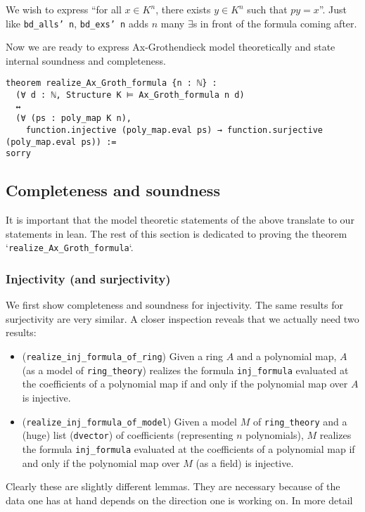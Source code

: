 We wish to express ``for all $x \in K^{n}$, there exists $y \in K^{n}$ such that $p y = x$''.
Just like \texttt{bd\_alls' n}, \texttt{bd\_exs' n} adds $n$ many $\exists$s in front of the
formula coming after.

Now we are ready to express Ax-Grothendieck model theoretically and state internal
soundness and completeness.
\begin{lstlisting}
theorem realize_Ax_Groth_formula {n : ℕ} :
  (∀ d : ℕ, Structure K ⊨ Ax_Groth_formula n d)
  ↔
  (∀ (ps : poly_map K n),
    function.injective (poly_map.eval ps) → function.surjective (poly_map.eval ps)) :=
sorry
\end{lstlisting}

\subsection{Completeness and soundness}

It is important that the model theoretic statements of the above translate to
our statements in lean. The rest of this section is dedicated to proving the
theorem `\texttt{realize\_Ax\_Groth\_formula}`.

\subsubsection*{Injectivity (and surjectivity)}

We first show completeness and soundness for injectivity.
The same results for surjectivity are very similar.
A closer inspection reveals that we actually need two results:
\begin{itemize}
  \item (\texttt{realize\_inj\_formula\_of\_ring})
    Given a ring $A$ and a polynomial map,
    $A$ (as a model of \texttt{ring\_theory})
    realizes the formula \texttt{inj\_formula} evaluated at the coefficients
    of a polynomial map if and only if the polynomial map over $A$ is injective.
  \item (\texttt{realize\_inj\_formula\_of\_model})
    Given a model $M$ of \texttt{ring\_theory} and a (huge) list
    (\texttt{dvector}) of coefficients (representing $n$ polynomials),
    $M$ realizes the formula
    \texttt{inj\_formula} evaluated at the coefficients of a polynomial map
    if and only if the polynomial map over $M$ (as a field) is injective.
\end{itemize}

Clearly these are slightly different lemmas.
They are necessary because of the data one has at hand
depends on the direction one is working on.
In more detail

